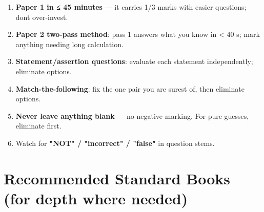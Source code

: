 

\begin{enumerate}
\def\labelenumi{\arabic{enumi}.}
\tightlist
\item
  \textbf{Paper 1 in ≤ 45 minutes} --- it carries 1/3 marks with easier questions; don\textquotesingle t over-invest.
\item
  \textbf{Paper 2 two-pass method}: pass 1 answers what you know in \textless{} 40 s; mark anything needing long calculation.
\item
  \textbf{Statement/assertion questions}: evaluate each statement independently; eliminate options.
\item
  \textbf{Match-the-following}: fix the one pair you are surest of, then eliminate options.
\item
  \textbf{Never leave anything blank} --- no negative marking. For pure guesses, eliminate first.
\item
  Watch for \textbf{"NOT" / "incorrect" / "false"} in question stems.
\end{enumerate}

\needspace{130pt}

\hypertarget{rev-plan--recommended-standard-books-for-depth-where-needed}{%
\section{Recommended Standard Books (for depth where needed)}\label{rev-plan--recommended-standard-books-for-depth-where-needed}}

\begingroup\small

